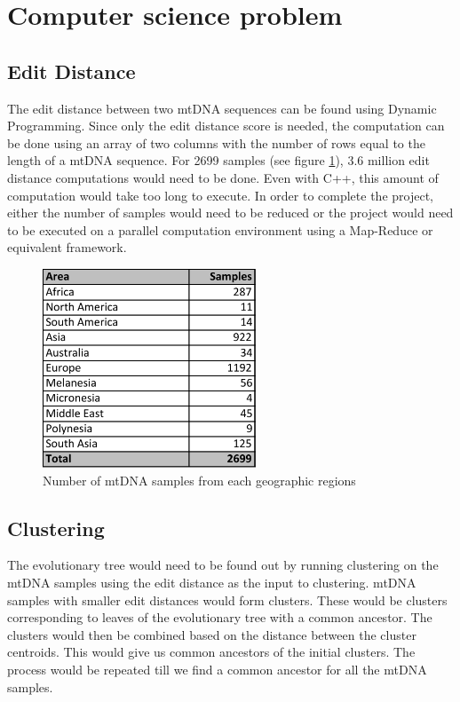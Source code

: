 \documentclass[conference]{IEEEtran}
\begin{document}
\section{Computer science problem}
\subsection{Edit Distance}
The edit distance between two mtDNA sequences can be found using Dynamic Programming. Since only the edit distance score is needed, the computation can be done using an array of two columns with the number of rows equal to the length of a mtDNA sequence. For 2699 samples (see figure \ref{DataSize}), 3.6 million edit distance computations would need to be done. Even with C++, this amount of computation would take too long to execute. In order to complete the project, either the number of samples would need to be reduced or the project would need to be executed on a parallel computation environment using a Map-Reduce or equivalent framework.

\begin{figure}[!t]
\centering
\includegraphics[width=2.5in]{./figures/DataSize.pdf}
\caption{Number of mtDNA samples from each geographic regions}
\label{DataSize}
\end{figure}

\subsection{Clustering}
The evolutionary tree would need to be found out by running clustering on the mtDNA samples using the edit distance as the input to clustering. mtDNA samples with smaller edit distances would form clusters. These would be clusters corresponding to leaves of the evolutionary tree with a common ancestor. The clusters would then be combined based on the distance between the cluster centroids. This would give us common ancestors of the initial clusters. The process would be repeated till we find a common ancestor for all the mtDNA samples. 
\end{document}
